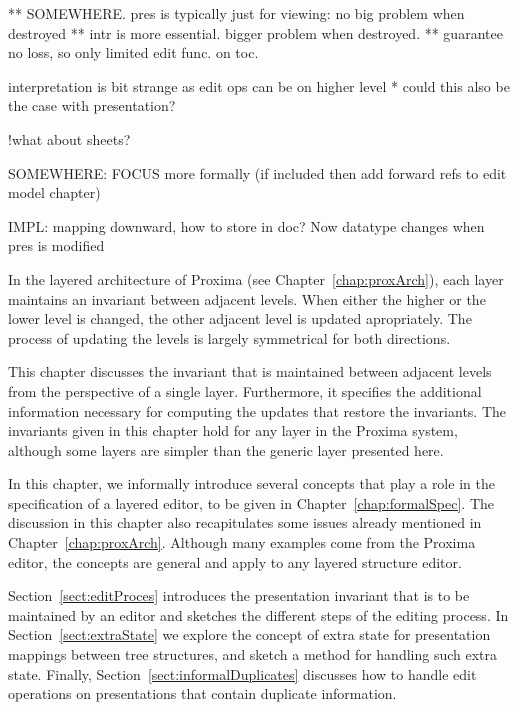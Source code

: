** SOMEWHERE. pres is typically just for viewing: no big problem when destroyed
** intr is more essential. bigger problem when destroyed.
** guarantee no loss, so only limited edit func. on toc.

interpretation is bit strange as edit ops can be on higher level
* could this also be the case with presentation?


!what about sheets? 

SOMEWHERE: FOCUS more formally (if included then add forward refs to edit model chapter)


IMPL: mapping downward, how to store in doc? Now datatype changes when pres is modified

\ec






\bc
In the layered architecture of Proxima (see Chapter~\ref{chap:proxArch}), each layer maintains an invariant between adjacent levels. When either the higher or the lower level is changed, the other adjacent level is updated apropriately. The process of updating the levels is largely symmetrical for both directions.

This chapter discusses the invariant that is maintained between adjacent levels from the perspective of a single layer. Furthermore, it specifies the additional information necessary for computing the updates that restore the invariants. The invariants given in this chapter hold for any layer in the Proxima system, although some layers are simpler than the generic layer presented here.

\ec

In this chapter, we informally introduce several concepts that play a role in the specification of a layered editor, to be given in Chapter~\ref{chap:formalSpec}. The discussion in this chapter also recapitulates some issues already mentioned in Chapter~\ref{chap:proxArch}. Although many examples come from the Proxima editor, the concepts are general and apply to any layered structure editor.

Section~\ref{sect:editProces} introduces the presentation invariant that is to be maintained by an editor and sketches the different steps of the editing process. In Section~\ref{sect:extraState} we explore the concept of extra state for presentation mappings between tree structures, and sketch a method for handling such extra state. Finally, Section~\ref{sect:informalDuplicates} discusses how to handle edit operations on presentations that contain duplicate information.


